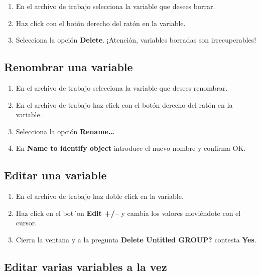 \documentclass[
]{book}
\providecommand{\tightlist}{%
  \setlength{\itemsep}{0pt}\setlength{\parskip}{0pt}}
\begin{document}
\begin{enumerate}
\def\labelenumi{\arabic{enumi}.}
\tightlist
\item
  En el archivo de trabajo selecciona la variable que desees borrar.
\item
  Haz click con el botón derecho del ratón en la variable.
\item
  Selecciona la opción \textbf{Delete}. ¡Atención, variables borradas son irrecuperables!
\end{enumerate}

\hypertarget{renombrar-una-variable}{%
\subsection{Renombrar una variable}\label{renombrar-una-variable}}

\begin{enumerate}
\def\labelenumi{\arabic{enumi}.}
\tightlist
\item
  En el archivo de trabajo selecciona la variable que desees renombrar.
\item
  En el archivo de trabajo haz click con el botón derecho del ratón en la variable.
\item
  Selecciona la opción \textbf{Rename\ldots{}}
\item
  En \textbf{Name to identify object} introduce el nuevo nombre y confirma OK.
\end{enumerate}

\hypertarget{editar-una-variable}{%
\subsection{Editar una variable}\label{editar-una-variable}}

\begin{enumerate}
\def\labelenumi{\arabic{enumi}.}
\tightlist
\item
  En el archivo de trabajo haz doble click en la variable.
\item
  Haz click en el bot´on \textbf{Edit +/--} y cambia los valores moviéndote con el cursor.
\item
  Cierra la ventana y a la pregunta \textbf{Delete Untitled GROUP?} contesta \textbf{Yes}.
\end{enumerate}

\hypertarget{editar-varias-variables-a-la-vez}{%
\subsection{Editar varias variables a la vez}\label{editar-varias-variables-a-la-vez}}
\end{document}
